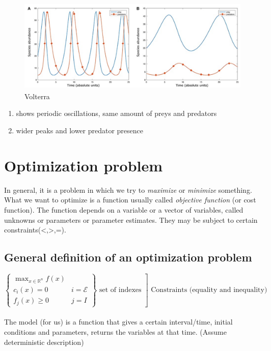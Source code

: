 \begin{figure}
\centering
\includegraphics[width=\textwidth]{volterra.png}
\caption{Volterra}
\label{fig:Volterra}
\end{figure}

\begin{enumerate}
\def\labelenumi{\Alph{enumi})}
\item
  shows periodic oscillations, same amount of preys and predators
\item
  wider peaks and lower predator presence
\end{enumerate}

\section{Optimization problem}

In general, it is a problem in which we try to \emph{maximize} or \emph{minimize}
something. What we want to optimize is a function usually called
\emph{objective function} (or cost function). The function depends on a
variable or a vector of variables, called unknowns or parameters or
parameter estimates. They may be subject to certain
constraints(\textless,\textgreater,=).

\subsection{General definition of an optimization problem}

$\left.\left\{\begin{array}{ll} \max _{x \in \mathbb{R}^n} f(x) & \\ c_i(x)=0 & i=\mathcal{E}\\ f_j(x) \geq 0 & j = I \end{array}\right\} \text { set of indexes }\right] \text { Constraints (equality and inequality) }$
\\
\\
\noindent
The model (for us) is a function that gives a certain interval/time,
initial conditions and parameters, returns the variables at that time.
(Assume deterministic description)

